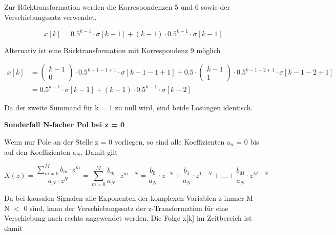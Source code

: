 \noindent Zur R\"{u}cktransformation werden die Korrespondenzen 5 und 6 sowie der Verschiebungssatz verwendet.

\begin{equation}\label{eq:fiveonehundredfourteen}
x\left[k\right]=0.5^{k-1} \cdot \sigma \left[k-1\right]+\left(k-1\right)\cdot 0.5^{k-1} \cdot \sigma \left[k-1\right]
\end{equation}

\noindent Alternativ ist eine R\"{u}cktransformation mit Korrespondenz 9 m\"{o}glich

\begin{equation}\label{eq:fiveonehundredfifteen}
\begin{split}
x\left[k\right] & = \left(\begin{array}{c} {k-1} \\ {0} \end{array}\right)\cdot 0.5^{k-1-1+1} \cdot \sigma \left[k-1-1+1\right]+0.5\cdot \left(\begin{array}{c} {k-1} \\ {1} \end{array}\right)\cdot 0.5^{k-1-2+1} \cdot \sigma \left[k-1-2+1\right] \\ 
&= 0.5^{k-1} \cdot \sigma \left[k-1\right]+(k-1)\cdot 0.5^{k-1} \cdot \sigma \left[k-2\right]    
\end{split}
\end{equation}

\noindent Da der zweite Summand f\"{u}r k = 1 zu null wird, sind beide L\"{o}sungen identisch.\bigskip

{\selectfont
\noindent\textbf{Sonderfall N-facher Pol bei z = 0}}\smallskip

\noindent Wenn nur Pole an der Stelle z = 0 vorliegen, so sind alle Koeffizienten a${}_{n}$ = 0 bis auf den Koeffizienten a${}_{N}$. Damit gilt

\begin{equation}\label{eq:fiveonehundredsixteen}
X\left(z\right)=\frac{\sum _{m=0}^{M}b_{m} \cdot z^{m}  }{a_{N} \cdot z^{N} } =\sum _{m=0}^{M}\frac{b_{m} }{a_{N} } \cdot z^{m-N}  =\frac{b_{0} }{a_{N} } \cdot z^{-N} +\frac{b_{1} }{a_{N} } \cdot z^{1-N} +...+\frac{b_{M} }{a_{N} } \cdot z^{M-N}
\end{equation}

\noindent Da bei kausalen Signalen alle Exponenten der komplexen Variablen z immer M - N $\mathrm{<}$ 0 sind, kann der Verschiebungssatz der z-Transformation f\"{u}r eine Verschiebung nach rechts angewendet werden. Die Folge x[k] im Zeitbereich ist damit

